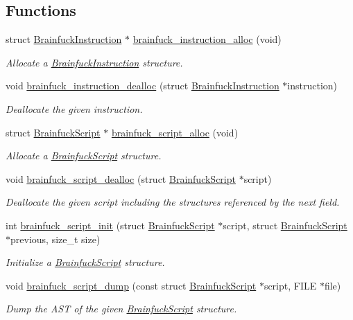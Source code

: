 \subsection*{Functions}
\begin{DoxyCompactItemize}
\item 
struct \hyperlink{structBrainfuckInstruction}{Brainfuck\+Instruction} $\ast$ \hyperlink{group__ast_gab59880c464bbe2b086edc539b8b4a182}{brainfuck\+\_\+instruction\+\_\+alloc} (void)
\begin{DoxyCompactList}\small\item\em Allocate a \hyperlink{structBrainfuckInstruction}{Brainfuck\+Instruction} structure. \end{DoxyCompactList}\item 
void \hyperlink{group__ast_ga2028b09c7f2692fb7fe2cee732919b2d}{brainfuck\+\_\+instruction\+\_\+dealloc} (struct \hyperlink{structBrainfuckInstruction}{Brainfuck\+Instruction} $\ast$instruction)
\begin{DoxyCompactList}\small\item\em Deallocate the given instruction. \end{DoxyCompactList}\item 
struct \hyperlink{structBrainfuckScript}{Brainfuck\+Script} $\ast$ \hyperlink{group__ast_ga696215066a723fd00583346961c7badf}{brainfuck\+\_\+script\+\_\+alloc} (void)
\begin{DoxyCompactList}\small\item\em Allocate a \hyperlink{structBrainfuckScript}{Brainfuck\+Script} structure. \end{DoxyCompactList}\item 
void \hyperlink{group__ast_ga83e4299ef98ee621ec8806b8fe89dde8}{brainfuck\+\_\+script\+\_\+dealloc} (struct \hyperlink{structBrainfuckScript}{Brainfuck\+Script} $\ast$script)
\begin{DoxyCompactList}\small\item\em Deallocate the given script including the structures referenced by the {\ttfamily next} field. \end{DoxyCompactList}\item 
int \hyperlink{group__ast_gaa5a1874a014a1f753286781f91d47afa}{brainfuck\+\_\+script\+\_\+init} (struct \hyperlink{structBrainfuckScript}{Brainfuck\+Script} $\ast$script, struct \hyperlink{structBrainfuckScript}{Brainfuck\+Script} $\ast$previous, size\+\_\+t size)
\begin{DoxyCompactList}\small\item\em Initialize a \hyperlink{structBrainfuckScript}{Brainfuck\+Script} structure. \end{DoxyCompactList}\item 
void \hyperlink{group__ast_gad6c3ba510dc8d04b4026c3b735aacba0}{brainfuck\+\_\+script\+\_\+dump} (const struct \hyperlink{structBrainfuckScript}{Brainfuck\+Script} $\ast$script, F\+I\+L\+E $\ast$file)
\begin{DoxyCompactList}\small\item\em Dump the A\+S\+T of the given \hyperlink{structBrainfuckScript}{Brainfuck\+Script} structure. \end{DoxyCompactList}\end{DoxyCompactItemize}


